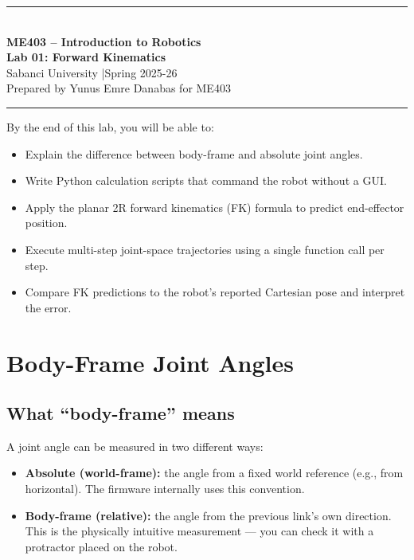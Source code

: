 \documentclass[11pt,a4paper]{article}
\begin{document}
\thispagestyle{fancy}
\begin{center}
  \rule{\linewidth}{1.5pt}\\[8pt]
  {\LARGE\bfseries ME403 -- Introduction to Robotics}\\[4pt]
  {\large\bfseries Lab 01: Forward Kinematics}\\[4pt]
  {\normalsize Sabanci University \quad|\quad Spring 2025-26}\\[4pt]
  {\small Prepared by Yunus Emre Danabas for ME403}\\[6pt]
  \rule{\linewidth}{1.5pt}
\end{center}

\vspace{5pt}

\begin{tcolorbox}[outcomebox]
  By the end of this lab, you will be able to:
  \begin{itemize}
    \item Explain the difference between body-frame and absolute joint angles.
    \item Write Python calculation scripts that command the robot without a GUI.
    \item Apply the planar 2R forward kinematics (FK) formula to predict end-effector position.
    \item Execute multi-step joint-space trajectories using a single function call per step.
    \item Compare FK predictions to the robot's reported Cartesian pose and interpret the error.
  \end{itemize}
\end{tcolorbox}

\section{Body-Frame Joint Angles}

\subsection{What ``body-frame'' means}

A joint angle can be measured in two different ways:
\begin{itemize}
  \item \textbf{Absolute (world-frame):} the angle from a fixed world reference (e.g., from horizontal). The firmware internally uses this convention.
  \item \textbf{Body-frame (relative):} the angle from the previous link's own direction. This is the physically intuitive measurement --- you can check it with a protractor placed on the robot.
\end{itemize}
\end{document}

